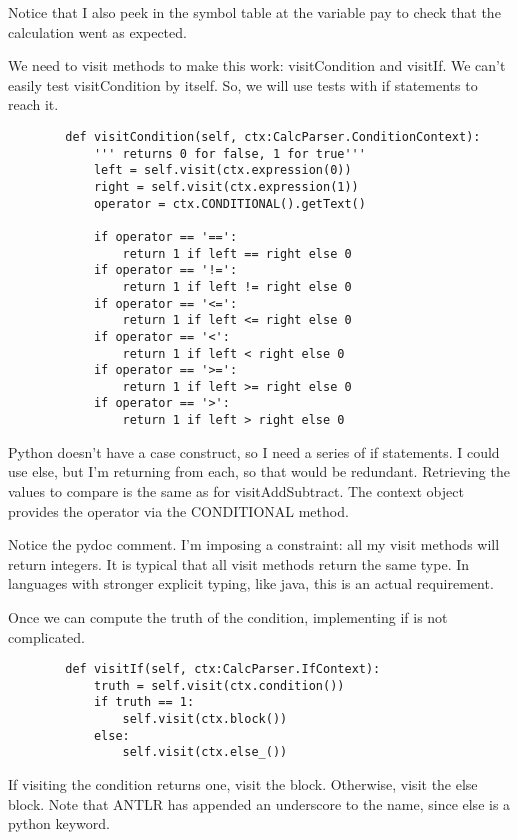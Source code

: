 Notice that I also peek in the symbol table at the variable pay to
check that the calculation went as expected.

We need to visit methods to make this work: visitCondition and visitIf.
We can't easily test visitCondition by itself. So, we will use tests
with if statements to reach it.

{\footnotesize
\begin{verbatim}
        def visitCondition(self, ctx:CalcParser.ConditionContext):
            ''' returns 0 for false, 1 for true'''
            left = self.visit(ctx.expression(0))
            right = self.visit(ctx.expression(1))
            operator = ctx.CONDITIONAL().getText()

            if operator == '==':
                return 1 if left == right else 0
            if operator == '!=':
                return 1 if left != right else 0
            if operator == '<=':
                return 1 if left <= right else 0
            if operator == '<':
                return 1 if left < right else 0
            if operator == '>=':
                return 1 if left >= right else 0
            if operator == '>':
                return 1 if left > right else 0
\end{verbatim}
}

Python doesn't have a case construct, so I need a series of if statements.
I could use else, but I'm returning from each, so that would be
redundant. Retrieving the values to compare is the same as for
visitAddSubtract. The context object provides the operator via the
CONDITIONAL method.

Notice the pydoc comment. I'm imposing a constraint: all my visit
methods will return integers. It is typical that all visit methods
return the same type. In languages with stronger explicit typing, like java,
this is an actual requirement.

Once we can compute the truth of the condition, implementing if is not
complicated.

{\footnotesize
\begin{verbatim}
        def visitIf(self, ctx:CalcParser.IfContext):
            truth = self.visit(ctx.condition())
            if truth == 1:
                self.visit(ctx.block())
            else:
                self.visit(ctx.else_())
\end{verbatim}
}

If visiting the condition returns one, visit the block. Otherwise,
visit the else block. Note that ANTLR has appended an underscore to
the name, since else is a python keyword.

